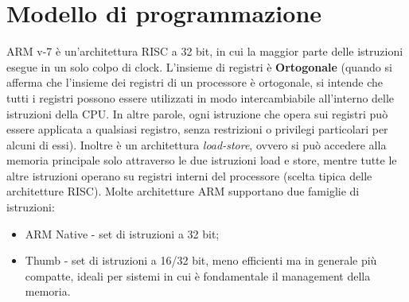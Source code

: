 \section{Modello di programmazione}
ARM v-7 è un'architettura RISC a 32 bit, in cui la maggior parte delle istruzioni esegue in un solo colpo di clock. L'insieme di registri è \textbf{Ortogonale} (quando si afferma che l'insieme dei registri di un processore è ortogonale, si intende che tutti i registri possono essere utilizzati in modo intercambiabile all'interno delle istruzioni della CPU. In altre parole, ogni istruzione che opera sui registri può essere applicata a qualsiasi registro, senza restrizioni o privilegi particolari per alcuni di essi). Inoltre è un architettura \textit{load-store}, ovvero si può accedere alla memoria principale solo attraverso le due istruzioni load e store, mentre tutte le altre istruzioni operano su registri interni del processore (scelta tipica delle architetture RISC). 
Molte architetture ARM supportano due famiglie di istruzioni:
\begin{itemize}
    \item ARM Native - set di istruzioni a 32 bit;
    \item Thumb - set di istruzioni a 16/32 bit, meno efficienti ma in generale più compatte, ideali per sistemi in cui è fondamentale il management della memoria. 
\end{itemize}

